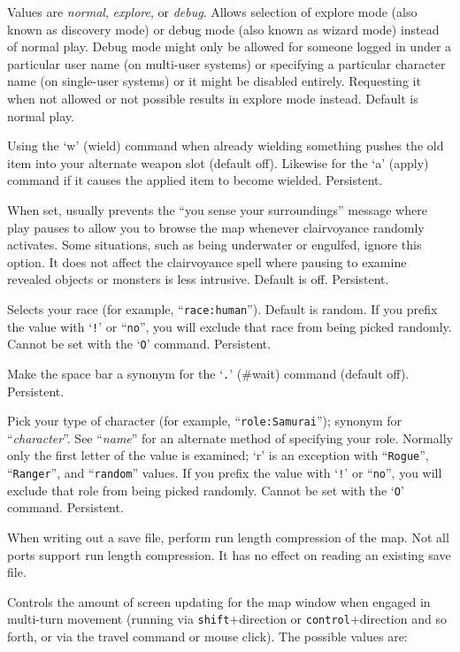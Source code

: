 \item[\ib{playmode}]
Values are {\it normal\/}, {\it explore\/}, or {\it debug\/}.
Allows selection of explore mode (also known as discovery mode) or debug
mode (also known as wizard mode) instead of normal play.
Debug mode might only be allowed for someone logged in under a particular
user name (on multi-user systems) or specifying a particular character
name (on single-user systems) or it might be disabled entirely.  Requesting
it when not allowed or not possible results in explore mode instead.
Default is normal play.
\item[\ib{pushweapon}]
Using the `w' (wield) command when already wielding
something pushes the old item into your alternate weapon slot (default off).
Likewise for the `a' (apply) command if it causes the applied item to
become wielded.  Persistent.
\item[\ib{quick\verb+_+farsight}]
When set, usually prevents the ``you sense your surroundings'' message
where play pauses to allow you to browse the map whenever clairvoyance
randomly activates.
Some situations, such as being underwater or engulfed, ignore this option.
It does not affect the clairvoyance spell where pausing to examine revealed
objects or monsters is less intrusive.
Default is off.  Persistent.
\item[\ib{race}]
Selects your race (for example, ``{\tt race:human}'').  Default is random.
If you prefix the value with `{\tt !}' or ``{\tt no}'', you will
exclude that race from being picked randomly.
Cannot be set with the `{\tt O}' command.  Persistent.
\item[\ib{rest\verb+_+on\verb+_+space}]
Make the space bar a synonym for the `{\tt .}' (\#wait) command (default off).
Persistent.
\item[\ib{role}]
Pick your type of character (for example, ``{\tt role:Samurai}'');
synonym for ``{\it character\/}''.  See ``{\it name\/}'' for an alternate method
of specifying your role.  Normally only the first letter of the
value is examined; `r' is an exception with ``{\tt Rogue}'', ``{\tt Ranger}'',
and ``{\tt random}'' values.
If you prefix the value with `{\tt !}' or ``{\tt no}'', you will
exclude that role from being picked randomly.
Cannot be set with the `{\tt O}' command.  Persistent.
\item[\ib{rlecomp}]
When writing out a save file, perform run length compression of the map.
Not all ports support run length compression. It has no
effect on reading an existing save file.
\item[\ib{runmode}]
Controls the amount of screen updating for the map window when engaged
in multi-turn movement (running via {\tt shift}+direction
or {\tt control}+direction
and so forth, or via the travel command or mouse click).
The possible values are:

